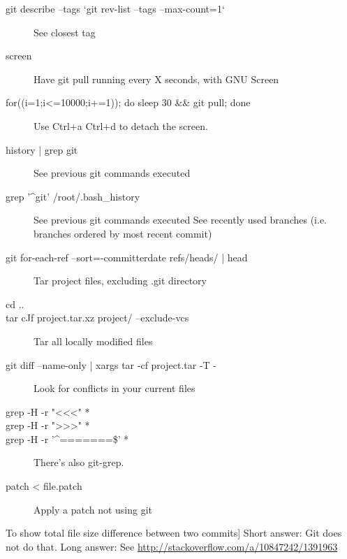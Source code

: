 \documentclass{article}
\begin{document}
\begin{description}
    \item [git describe --tags `git rev-list --tags --max-count=1`]
        See closest tag
    \item [screen]
        Have git pull running every X seconds, with GNU Screen
    \item [for((i=1;i<=10000;i+=1)); do sleep 30 \&\& git pull; done]
        Use Ctrl+a Ctrl+d to detach the screen.
    \item [history | grep git]
        See previous git commands executed
    \item [grep '\^{}git'  /root/.bash\_history]
        See previous git commands executed
    See recently used branches (i.e. branches ordered by most recent commit)
    \item [git for-each-ref --sort=-committerdate refs/heads/ | head]
        Tar project files, excluding .git directory
    \item [cd ..]
    \item [tar cJf project.tar.xz project/ --exclude-vcs]
        Tar all locally modified files
    \item [git diff --name-only | xargs tar -cf project.tar -T -]
        Look for conflicts in your current files
    \item [grep -H -r "<<<" *]
    \item [grep -H -r ">>>" *]
    \item [grep -H -r '\^{}=======\$' *]
        There's also git-grep.
    \item [patch < file.patch]
        Apply a patch not using git
\end{description}
To show total file size difference between two commits]
    Short answer: Git does not do that.
    Long answer: See \url{http://stackoverflow.com/a/10847242/1391963}
\end{document}
